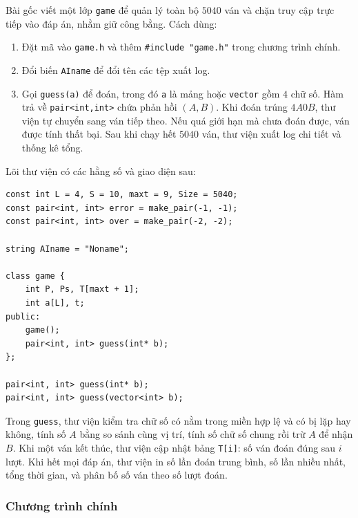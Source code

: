 \documentclass[11pt]{article}
\newcommand{\AB}[2]{#1A#2B}
\begin{document}
Bài gốc viết một lớp \texttt{game} để quản lý toàn bộ \(5040\) ván và chặn
truy cập trực tiếp vào đáp án, nhằm giữ công bằng. Cách dùng:
\begin{enumerate}
  \item Đặt mã vào \texttt{game.h} và thêm \verb|#include "game.h"| trong
  chương trình chính.
  \item Đổi biến \texttt{AIname} để đổi tên các tệp xuất log.
  \item Gọi \texttt{guess(a)} để đoán, trong đó \texttt{a} là mảng hoặc
  \texttt{vector} gồm \(4\) chữ số. Hàm trả về \texttt{pair<int,int>} chứa
  phản hồi \((A,B)\). Khi đoán trúng \(\AB{4}{0}\), thư viện tự chuyển sang
  ván tiếp theo. Nếu quá giới hạn mà chưa đoán được, ván được tính thất bại.
  Sau khi chạy hết \(5040\) ván, thư viện xuất log chi tiết và thống kê tổng.
\end{enumerate}

Lõi thư viện có các hằng số và giao diện sau:
\begin{verbatim}
const int L = 4, S = 10, maxt = 9, Size = 5040;
const pair<int, int> error = make_pair(-1, -1);
const pair<int, int> over = make_pair(-2, -2);

string AIname = "Noname";

class game {
    int P, Ps, T[maxt + 1];
    int a[L], t;
public:
    game();
    pair<int, int> guess(int* b);
};

pair<int, int> guess(int* b);
pair<int, int> guess(vector<int> b);
\end{verbatim}

Trong \texttt{guess}, thư viện kiểm tra chữ số có nằm trong miền hợp lệ và có
bị lặp hay không, tính số \(A\) bằng so sánh cùng vị trí, tính số chữ số chung
rồi trừ \(A\) để nhận \(B\). Khi một ván kết thúc, thư viện cập nhật bảng
\texttt{T[i]}: số ván đoán đúng sau \(i\) lượt. Khi hết mọi đáp án, thư viện
in số lần đoán trung bình, số lần nhiều nhất, tổng thời gian, và phân bố số
ván theo số lượt đoán.

\subsubsection{Chương trình chính}
\end{document}
